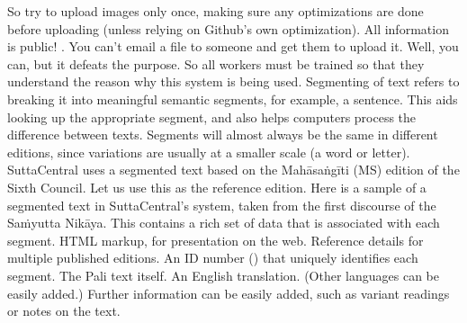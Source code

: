 \markdownRendererUlItem {} So try to upload images only once, making sure any optimizations are done before uploading (unless relying on Github’s own optimization).\markdownRendererUlItemEnd 
\markdownRendererUlItem {} All information is public!\markdownRendererUlItemEnd 
\markdownRendererUlItem {}. You can’t email a file to someone and get them to upload it. Well, you can, but it defeats the purpose. So all workers must be trained so that they understand the reason why this system is being used.\markdownRendererUlItemEnd 
\markdownRendererUlEndTight \markdownRendererInterblockSeparator
{}\markdownRendererInterblockSeparator
{}Segmenting of text refers to breaking it into meaningful semantic segments, for example, a sentence. This aids looking up the appropriate segment, and also helps computers process the difference between texts.\markdownRendererInterblockSeparator
{}Segments will almost always be the same in different editions, since variations are usually at a smaller scale (a word or letter).\markdownRendererInterblockSeparator
{}SuttaCentral uses a segmented text based on the Mahāsaṅgīti (MS) edition of the Sixth Council. Let us use this as the reference edition. Here is a sample of a segmented text in SuttaCentral’s system, taken from the first discourse of the Saṁyutta Nikāya.\markdownRendererInterblockSeparator
{}\markdownRendererInterblockSeparator
{}This contains a rich set of data that is associated with each segment.\markdownRendererInterblockSeparator
{}\markdownRendererOlBeginTight
{}HTML markup, for presentation on the web.\markdownRendererOlItemEnd 
{}Reference details for multiple published editions.\markdownRendererOlItemEnd 
{}An ID number () that uniquely identifies each segment.\markdownRendererOlItemEnd 
{}The Pali text itself.\markdownRendererOlItemEnd 
{}An English translation. (Other languages can be easily added.)\markdownRendererOlItemEnd 
\markdownRendererOlEndTight \markdownRendererInterblockSeparator
{}Further information can be easily added, such as variant readings or notes on the text.\markdownRendererInterblockSeparator
